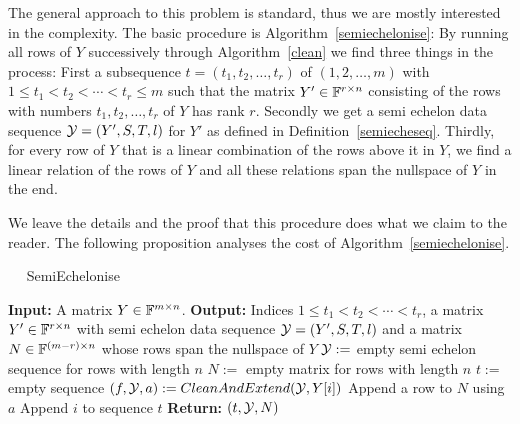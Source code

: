 The general approach to this problem is standard, thus we are mostly
interested in the complexity. The basic procedure is
Algorithm~\ref{semiechelonise}: By running
all rows of $Y$ successively through Algorithm~\ref{clean} we
find three things in the process: First a subsequence
$t=(t_1,t_2, \ldots, t_{r})$ of $(1,2,\ldots, m)$ with
$1 \le t_1 < t_2 < \cdots < t_r \le m$ such that the matrix
$Y' \in \mathbb{F}^{r \times n}$ consisting of the rows with numbers 
$t_1, t_2, \ldots, t_r$ of $Y$ has rank $r$. Secondly we get a
semi echelon data sequence $\mathcal{Y} = (Y',S,T,l)$ for $Y'$ as defined
in Definition~\ref{semiecheseq}. Thirdly, for every row of $Y$ that
is a linear combination of the rows above it in $Y$, we find a linear 
relation of the rows of $Y$ and all these relations span the nullspace
of $Y$ in the end.

We leave the details and the proof that this procedure does what
we claim to the reader. The following proposition analyses the cost
of Algorithm~\ref{semiechelonise}.

\begin{algorithm}
\caption{$\quad$ \sc SemiEchelonise}
%
\label{semiechelonise}
\begin{algorithmic}
\STATE \textbf{Input:} A matrix $Y \in \mathbb{F}^{m \times n}$.
\STATE \textbf{Output:} Indices $1 \le t_1 < t_2 < \cdots < t_r$,
a matrix $Y' \in \mathbb{F}^{r \times n}$ with semi echelon data sequence
\STATE \mbox{}
$\mathcal{Y} = (Y',S,T,l)$ and a matrix $N \in \mathbb{F}^{(m-r) \times n}$
whose rows span the nullspace of $Y$
\STATE $\mathcal{Y} := $ empty semi echelon sequence for rows with length $n$
\STATE $N := $ empty matrix for rows with length $n$
\STATE $t := $ empty sequence
    \STATE $(f,\calY,a) := \textsc{CleanAndExtend}(\calY,Y[i])$
        \STATE Append a row to $N$ using $a$
    \ELSE
        \STATE Append $i$ to sequence $t$
    \ENDIF
\ENDFOR
\STATE \textbf{Return:} $(t,\mathcal{Y},N)$
\end{algorithmic}
\end{algorithm}

